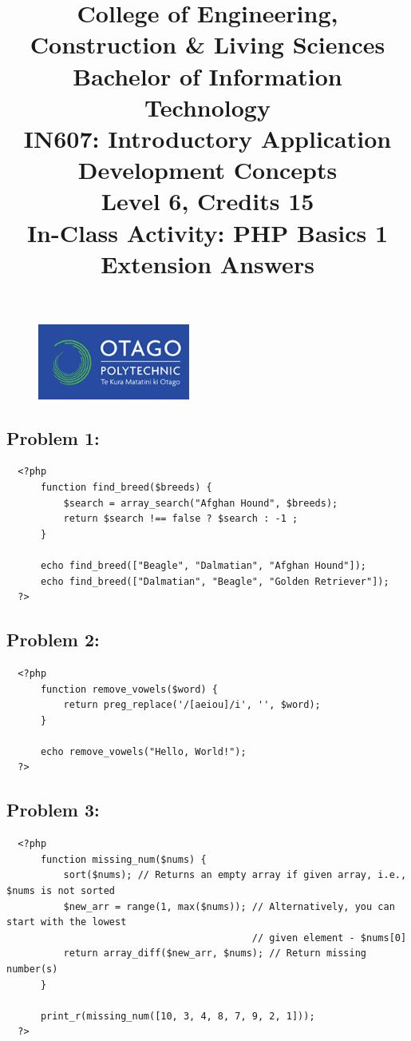 \documentclass{article}
\author{}
\begin{document}
\begin{figure}
    \centering
    \includegraphics[width=50mm]{../img/logo.png}
\end{figure}

\title{College of Engineering, Construction \& Living Sciences\\Bachelor of Information Technology\\IN607: Introductory Application Development Concepts\\Level 6, Credits 15\\\textbf{In-Class Activity: PHP Basics 1 Extension Answers}}
\date{}
\maketitle
 
\subsection*{Problem 1:} 
\begin{verbatim}
  <?php
      function find_breed($breeds) {
          $search = array_search("Afghan Hound", $breeds);
          return $search !== false ? $search : -1 ;	
      }

      echo find_breed(["Beagle", "Dalmatian", "Afghan Hound"]);
      echo find_breed(["Dalmatian", "Beagle", "Golden Retriever"]);
  ?>
\end{verbatim}

\subsection*{Problem 2:} 
\begin{verbatim}
  <?php
      function remove_vowels($word) {
          return preg_replace('/[aeiou]/i', '', $word);
      }

      echo remove_vowels("Hello, World!");
  ?>
\end{verbatim}

\subsection*{Problem 3:} 
\begin{verbatim}
  <?php
      function missing_num($nums) {
          sort($nums); // Returns an empty array if given array, i.e., $nums is not sorted
          $new_arr = range(1, max($nums)); // Alternatively, you can start with the lowest 
                                           // given element - $nums[0]                                                
          return array_diff($new_arr, $nums); // Return missing number(s)
      }
        
      print_r(missing_num([10, 3, 4, 8, 7, 9, 2, 1]));
  ?>
\end{verbatim}
\end{document}
